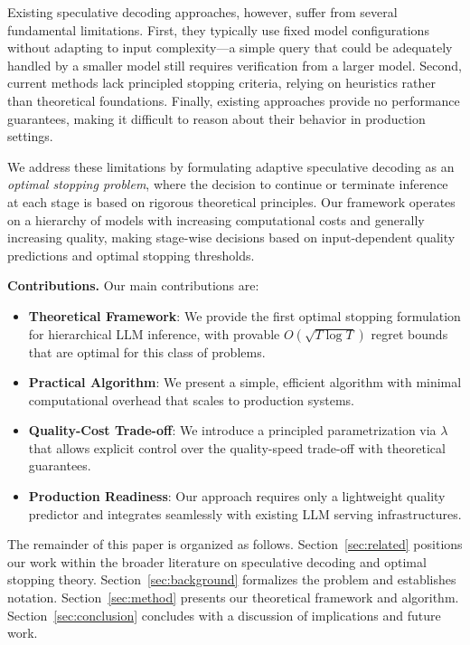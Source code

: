 \documentclass{article}
\theoremstyle{plain}
\theoremstyle{definition}
\theoremstyle{remark}
\begin{document}
Existing speculative decoding approaches, however, suffer from several fundamental limitations. First, they typically use fixed model configurations without adapting to input complexity—a simple query that could be adequately handled by a smaller model still requires verification from a larger model. Second, current methods lack principled stopping criteria, relying on heuristics rather than theoretical foundations. Finally, existing approaches provide no performance guarantees, making it difficult to reason about their behavior in production settings.

We address these limitations by formulating adaptive speculative decoding as an \emph{optimal stopping problem}, where the decision to continue or terminate inference at each stage is based on rigorous theoretical principles. Our framework operates on a hierarchy of models with increasing computational costs and generally increasing quality, making stage-wise decisions based on input-dependent quality predictions and optimal stopping thresholds.

\textbf{Contributions.} Our main contributions are:
\begin{itemize}
\item \textbf{Theoretical Framework}: We provide the first optimal stopping formulation for hierarchical LLM inference, with provable $O(\sqrt{T \log T})$ regret bounds that are optimal for this class of problems.
\item \textbf{Practical Algorithm}: We present a simple, efficient algorithm with minimal computational overhead that scales to production systems.
\item \textbf{Quality-Cost Trade-off}: We introduce a principled parametrization via $\lambda$ that allows explicit control over the quality-speed trade-off with theoretical guarantees.
\item \textbf{Production Readiness}: Our approach requires only a lightweight quality predictor and integrates seamlessly with existing LLM serving infrastructures.
\end{itemize}

The remainder of this paper is organized as follows. Section~\ref{sec:related} positions our work within the broader literature on speculative decoding and optimal stopping theory. Section~\ref{sec:background} formalizes the problem and establishes notation. Section~\ref{sec:method} presents our theoretical framework and algorithm. Section~\ref{sec:conclusion} concludes with a discussion of implications and future work.
\end{document}
